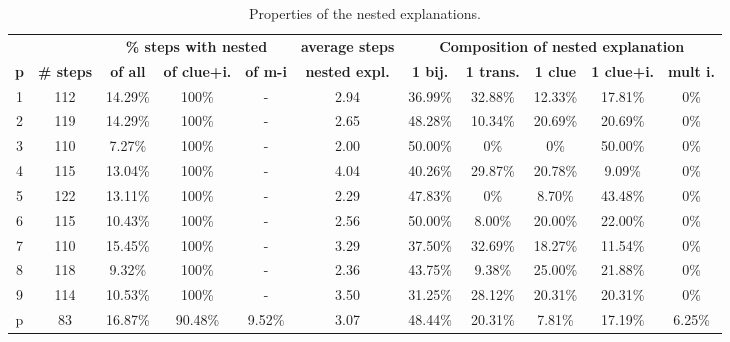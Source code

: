 \begin{table}[t]
	\centering
	\begin{tabular}{c|c|ccc|c|ccccc}
		& &  \multicolumn{3}{c|}{\textbf{\% steps with nested}} & \multicolumn{1}{c|}{\textbf{average steps}} & \multicolumn{5}{c}{\textbf{Composition of nested explanation }}\\
		\textbf{p} & \textbf{\# steps } & \textbf{of all}     & \textbf{of clue+i.} & \textbf{of m-i}          & \textbf{nested expl.} & \textbf{1 bij.} & \textbf{1 trans.} & \textbf{1 clue} & \textbf{1 clue+i.} & \textbf{mult i.} \\ \hline
		1 &      112 &  14.29\% &  100\% &  - &         2.94 &  36.99\% &   32.88\% &  12.33\% &    17.81\% &    0\% \\
		2 &      119 &  14.29\% &  100\% &  - &         2.65 &  48.28\% &   10.34\% &  20.69\% &    20.69\% &    0\% \\
		3 &      110 &   7.27\% &  100\% &  - &         2.00 &  50.00\% &    0\% &   0\% &    50.00\% &    0\% \\
		4 &      115 &  13.04\% &  100\% &  - &         4.04 &  40.26\% &   29.87\% &  20.78\% &     9.09\% &    0\% \\
		5 &      122 &  13.11\% &  100\% &  - &         2.29 &  47.83\% &    0\% &   8.70\% &    43.48\% &    0\% \\
		6 &      115 &  10.43\% &  100\% &  - &         2.56 &  50.00\% &    8.00\% &  20.00\% &    22.00\% &    0\% \\
		7 &      110 &  15.45\% &  100\% &  - &         3.29 &  37.50\% &   32.69\% &  18.27\% &    11.54\% &    0\% \\
		8 &      118 &   9.32\% &  100\% &  - &         2.36 &  43.75\% &    9.38\% &  25.00\% &    21.88\% &    0\% \\
		9 &      114 &  10.53\% &  100\% &  - &         3.50 &  31.25\% &   28.12\% &  20.31\% &    20.31\% &    0\% \\
		p &       83 &  16.87\% &   90.48\% &  9.52\% &         3.07 &  48.44\% &   20.31\% &   7.81\% &    17.19\% &    6.25\% \\
	\end{tabular}
	\caption{Properties of the nested explanations.   }
	\label{table:nested_explanation}
\end{table}

